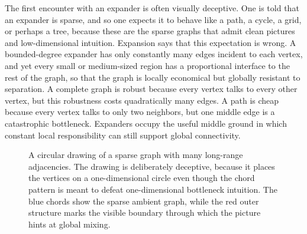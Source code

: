 The first encounter with an expander is often visually deceptive. One is told that an expander is sparse, and so one expects it to behave like a path, a cycle, a grid, or perhaps a tree, because these are the sparse graphs that admit clean pictures and low-dimensional intuition. Expansion says that this expectation is wrong. A bounded-degree expander has only constantly many edges incident to each vertex, and yet every small or medium-sized region has a proportional interface to the rest of the graph, so that the graph is locally economical but globally resistant to separation. A complete graph is robust because every vertex talks to every other vertex, but this robustness costs quadratically many edges. A path is cheap because every vertex talks to only two neighbors, but one middle edge is a catastrophic bottleneck. Expanders occupy the useful middle ground in which constant local responsibility can still support global connectivity.

\begin{figure}[tb]
	\centering
	\begin{mdframed}[linewidth=0.4pt, linecolor=expanderMutedColor!45, backgroundcolor=white, roundcorner=2pt, innerleftmargin=6pt, innerrightmargin=6pt, innertopmargin=6pt, innerbottommargin=6pt]
		\centering
	\end{mdframed}
	\caption{A circular drawing of a sparse graph with many long-range adjacencies. The drawing is deliberately deceptive, because it places the vertices on a one-dimensional circle even though the chord pattern is meant to defeat one-dimensional bottleneck intuition. The blue chords show the sparse ambient graph, while the red outer structure marks the visible boundary through which the picture hints at global mixing.}
	\label{fig:introduction-circular-expander}
\end{figure}


